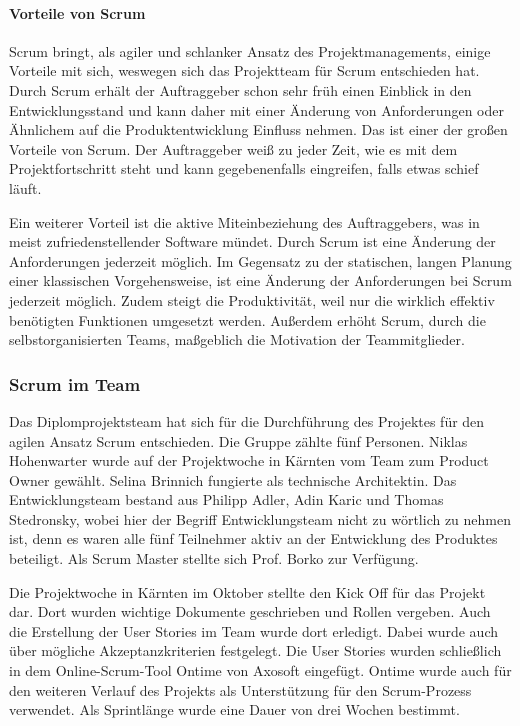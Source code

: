 \paragraph{Vorteile von Scrum}
Scrum bringt, als agiler und schlanker Ansatz des Projektmanagements, einige Vorteile mit sich, weswegen sich das Projektteam für Scrum entschieden hat. Durch Scrum erhält der Auftraggeber schon sehr früh einen Einblick in den Entwicklungsstand und kann daher mit einer Änderung von Anforderungen oder Ähnlichem auf die Produktentwicklung Einfluss nehmen. Das ist einer der großen Vorteile von Scrum. Der Auftraggeber weiß zu jeder Zeit, wie es mit dem Projektfortschritt steht und kann gegebenenfalls eingreifen, falls etwas schief läuft.

Ein weiterer Vorteil ist die aktive Miteinbeziehung des Auftraggebers, was in meist zufriedenstellender Software mündet. Durch Scrum ist eine Änderung der Anforderungen jederzeit möglich. Im Gegensatz zu der statischen, langen Planung einer klassischen Vorgehensweise, ist eine Änderung der Anforderungen bei Scrum jederzeit möglich. Zudem steigt die Produktivität, weil nur die wirklich effektiv benötigten Funktionen umgesetzt werden. Außerdem erhöht Scrum, durch die selbstorganisierten Teams, maßgeblich die Motivation der Teammitglieder.

\newpage

\subsubsection{Scrum im Team}
Das Diplomprojektsteam hat sich für die Durchführung des Projektes für den agilen Ansatz Scrum entschieden. Die Gruppe zählte fünf Personen. Niklas Hohenwarter wurde auf der Projektwoche in Kärnten vom Team zum Product Owner gewählt. Selina Brinnich fungierte als technische Architektin. Das Entwicklungsteam bestand aus Philipp Adler, Adin Karic und Thomas Stedronsky, wobei hier der Begriff Entwicklungsteam nicht zu wörtlich zu nehmen ist, denn es waren alle fünf Teilnehmer aktiv an der Entwicklung des Produktes beteiligt. Als Scrum Master stellte sich Prof. Borko zur Verfügung.

Die Projektwoche in Kärnten im Oktober stellte den Kick Off für das Projekt dar. Dort wurden wichtige Dokumente geschrieben und Rollen vergeben. Auch die Erstellung der User Stories im Team wurde dort erledigt. Dabei wurde auch über mögliche Akzeptanzkriterien festgelegt. Die User Stories wurden schließlich in dem Online-Scrum-Tool Ontime von Axosoft eingefügt. Ontime wurde auch für den weiteren Verlauf des Projekts als Unterstützung für den Scrum-Prozess verwendet. Als Sprintlänge wurde eine Dauer von drei Wochen bestimmt.

